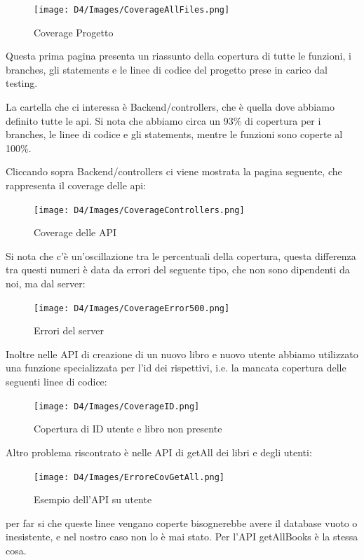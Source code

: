\documentclass{article}
\begin{document}
\begin{figure}[H]
    \centering
    \texttt{[image: D4/Images/CoverageAllFiles.png]}
    \caption{Coverage Progetto}
\end{figure}

Questa prima pagina presenta un riassunto della copertura di tutte le funzioni, i branches, gli statements e le linee di codice del progetto prese in carico dal testing.

La cartella che ci interessa è Backend/controllers, che è quella dove abbiamo definito tutte le api.
Si nota che abbiamo circa un 93\% di copertura per i branches, le linee di codice e gli statements, mentre le funzioni sono coperte al 100\%.

Cliccando sopra Backend/controllers ci viene mostrata la pagina seguente,  che rappresenta il coverage delle api:

\begin{figure}[H]
    \centering
    \texttt{[image: D4/Images/CoverageControllers.png]}
    \caption{Coverage delle API}
\end{figure}

Si nota che c'è un'oscillazione tra le percentuali della copertura, questa differenza tra questi numeri è data da errori del seguente tipo, che non sono dipendenti da noi, ma dal server:

\begin{figure}[H]
    \centering
    \texttt{[image: D4/Images/CoverageError500.png]}
    \caption{Errori del server}
\end{figure}

Inoltre nelle API di creazione di un nuovo libro e nuovo utente abbiamo utilizzato una funzione specializzata per l'id dei rispettivi, i.e. la mancata copertura delle seguenti linee di codice:

\begin{figure}[H]
    \centering
    \texttt{[image: D4/Images/CoverageID.png]}
    \caption{Copertura di ID utente e libro non presente}
\end{figure}


Altro problema riscontrato è nelle API di getAll dei libri e degli utenti:

\begin{figure}[H]
    \centering
    \texttt{[image: D4/Images/ErroreCovGetAll.png]}
    \caption{Esempio dell'API su utente}
\end{figure}

per far si che queste linee vengano coperte bisognerebbe avere il database vuoto o inesistente, e nel nostro caso non lo è mai stato.
Per l'API getAllBooks è la stessa cosa.
\end{document}
